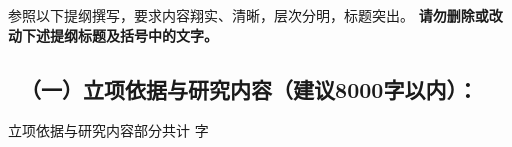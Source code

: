 {\sihao \kaishu 参照以下提纲撰写，要求内容翔实、清晰，层次分明，标题突出。{\color{MsBlue} \bfseries 请勿删除或改动下述提纲标题及括号中的文字。}}
\vskip -5mm
{\color{MsBlue} \subsection{\texorpdfstring{\sihao \kaishu \quad \ （一）立项依据与研究内容\textnormal{\kaishu （建议8000字以内）：}}{（一）立项依据与研究内容（建议8000字以内）：}}}




% 



% 



% 



% 



% 



\ifhandout
\else
\begin{center}
{\larger[2]\color{red}  立项依据与研究内容部分共计 \wordcount 字 }
\end{center}
\fi
